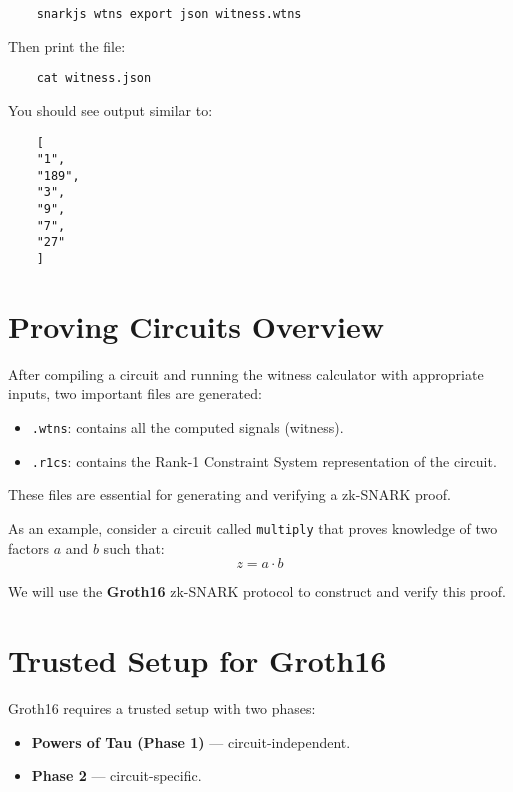 \documentclass{article}
\begin{document}
\begin{verbatim}
	snarkjs wtns export json witness.wtns
\end{verbatim}

Then print the file:

\begin{verbatim}
	cat witness.json
\end{verbatim}

You should see output similar to:

\begin{verbatim}
	[
	"1",
	"189",
	"3",
	"9",
	"7",
	"27"
	]
\end{verbatim}

	\section{Proving Circuits Overview}
	
	After compiling a circuit and running the witness calculator with appropriate inputs, two important files are generated:
	\begin{itemize}
		\item \texttt{.wtns}: contains all the computed signals (witness).
		\item \texttt{.r1cs}: contains the Rank-1 Constraint System representation of the circuit.
	\end{itemize}
	
	These files are essential for generating and verifying a zk-SNARK proof.
	
	\medskip
	
	As an example, consider a circuit called \texttt{multiply} that proves knowledge of two factors \(a\) and \(b\) such that:
	\[
	z=a \cdot b 
	\]
	
	We will use the \textbf{Groth16} zk-SNARK protocol to construct and verify this proof.
	
	\section*{Trusted Setup for Groth16}
	
	Groth16 requires a trusted setup with two phases:
	
	\begin{itemize}
		\item \textbf{Powers of Tau (Phase 1)} — circuit-independent.
		\item \textbf{Phase 2} — circuit-specific.
	\end{itemize}
	
\end{document}
